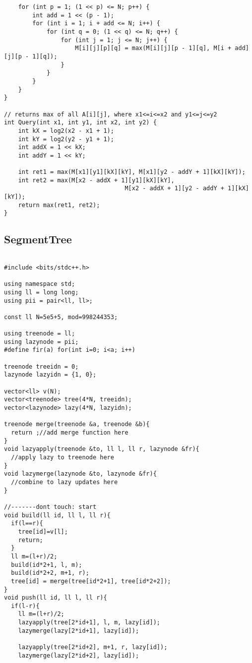 \documentclass[FSZ,a4paper,onesided]{article}
\begin{document}
\begin{multicols*}{\COLS}
\begin{lstlisting}
    for (int p = 1; (1 << p) <= N; p++) {
        int add = 1 << (p - 1);
        for (int i = 1; i + add <= N; i++) {
            for (int q = 0; (1 << q) <= N; q++) {
                for (int j = 1; j <= N; j++) {
                    M[i][j][p][q] = max(M[i][j][p - 1][q], M[i + add][j][p - 1][q]);
                }
            }
        }
    }
}

// returns max of all A[i][j], where x1<=i<=x2 and y1<=j<=y2
int Query(int x1, int y1, int x2, int y2) {
    int kX = log2(x2 - x1 + 1);
    int kY = log2(y2 - y1 + 1);
    int addX = 1 << kX;
    int addY = 1 << kY;

    int ret1 = max(M[x1][y1][kX][kY], M[x1][y2 - addY + 1][kX][kY]);
    int ret2 = max(M[x2 - addX + 1][y1][kX][kY],
                                  M[x2 - addX + 1][y2 - addY + 1][kX][kY]);
    return max(ret1, ret2);
}
\end{lstlisting}
\subsection{SegmentTree}
\begin{lstlisting}

#include <bits/stdc++.h>

using namespace std;
using ll = long long;
using pii = pair<ll, ll>;

const ll N=5e5+5, mod=998244353;

using treenode = ll;
using lazynode = pii;
#define fir(a) for(int i=0; i<a; i++)

treenode treeidn = 0;
lazynode lazyidn = {1, 0};

vector<ll> v(N);
vector<treenode> tree(4*N, treeidn);
vector<lazynode> lazy(4*N, lazyidn);

treenode merge(treenode &a, treenode &b){
  return ;//add merge function here
}
void lazyapply(treenode &to, ll l, ll r, lazynode &fr){
  //apply lazy to treenode here
}
void lazymerge(lazynode &to, lazynode &fr){
  //combine to lazy updates here
}

//-------dont touch: start
void build(ll id, ll l, ll r){
  if(l==r){
    tree[id]=v[l];
    return;
  }
  ll m=(l+r)/2;
  build(id*2+1, l, m);
  build(id*2+2, m+1, r);
  tree[id] = merge(tree[id*2+1], tree[id*2+2]);
}
void push(ll id, ll l, ll r){
  if(l-r){
    ll m=(l+r)/2;
    lazyapply(tree[2*id+1], l, m, lazy[id]);
    lazymerge(lazy[2*id+1], lazy[id]);

    lazyapply(tree[2*id+2], m+1, r, lazy[id]);
    lazymerge(lazy[2*id+2], lazy[id]);


\end{lstlisting}
\end{multicols*}
\end{document}
